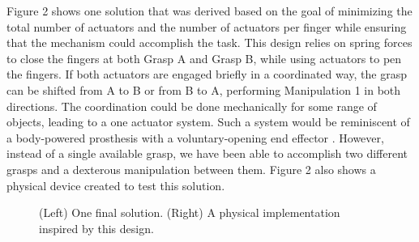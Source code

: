 Figure 2 shows one solution that was derived based on the goal of minimizing the total number of actuators and the number of actuators per finger while ensuring that the mechanism could accomplish the task.  This design relies on spring forces to close the fingers at both Grasp A and Grasp B, while using actuators to pen the fingers.   If both actuators are engaged briefly in a coordinated way, the grasp can be shifted from A to B or from B to A, performing Manipulation 1 in both directions.   The coordination could be done mechanically for some range of objects, leading to a one actuator system.   Such a system would be reminiscent of a body-powered prosthesis with a voluntary-opening end effector \cite{smith2004atlas}.   However, instead of a single available grasp, we have been able to accomplish two different grasps and a dexterous manipulation between them.
Figure 2 also shows a physical device created to test this solution.

\begin{figure}
\begin{center}
\vspace*{2in}
\end{center}
\caption[]{(Left) One final solution.  (Right) A physical implementation inspired by this design.}
\label{SimpleExampleResults}
\end{figure}


